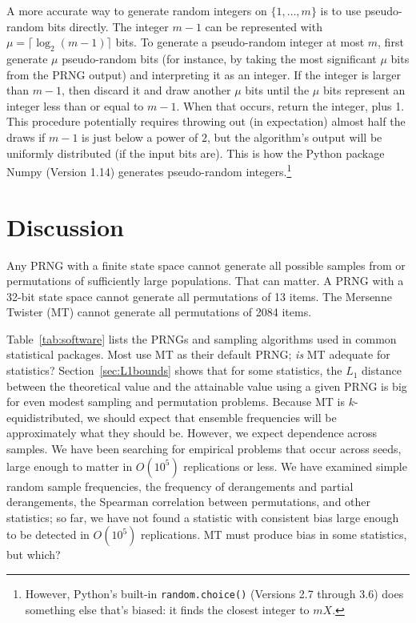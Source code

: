 \documentclass[graybox]{svmult}
\begin{document}
A more accurate way to generate random integers on $\{1, \dots, m\}$ is to use pseudo-random bits directly. 
The integer $m-1$ can be represented with $\mu = \lceil \log_2(m-1) \rceil$ bits. 
To generate a pseudo-random integer at most $m$, first generate $\mu$ pseudo-random bits (for instance, by taking the most significant $\mu$ bits from the PRNG output) and interpreting it as an integer.  
If the integer is larger than $m-1$, then discard it and draw another $\mu$ bits until the $\mu$ bits represent an integer less than or equal to $m-1$.
When that occurs, return the integer, plus 1.
This procedure potentially requires throwing out (in expectation) almost half the draws if $m-1$ is 
just below a power of $2$, but the algorithm's output will be uniformly distributed (if the input bits are).
This is how the Python package Numpy (Version 1.14) generates pseudo-random integers.\footnote{
However, Python's built-in \texttt{random.choice()} (Versions 2.7 through 3.6) does something else that's biased: it finds the closest integer to $mX$.
}


\section{Discussion}
\label{sec:discussion}

Any PRNG with a finite state space cannot generate all possible samples from or permutations of 
sufficiently large populations.
That can matter.
A PRNG with a 32-bit state space cannot generate all permutations of 13 items.
The Mersenne Twister (MT) cannot generate all permutations of 2084 items.

Table~\ref{tab:software} lists the PRNGs and sampling algorithms used in common statistical packages.
Most use MT as their default PRNG; \emph{is} MT adequate for statistics?
Section~\ref{sec:L1bounds} shows that for some statistics, the $L_1$ distance between the theoretical value and the attainable value using a given PRNG
 is big for even modest sampling and permutation problems.
Because MT is $k$-equidistributed, we should expect that ensemble frequencies will be approximately
what they should be.
However, we expect dependence across samples.
We have been searching for empirical problems that occur across seeds, large enough to matter in 
$O(10^5)$ replications or less.
We have examined simple random sample frequencies, the frequency of derangements and partial derangements, the Spearman correlation between permutations, 
and other statistics; so far, we have not found a statistic with consistent
bias large enough to be detected in $O(10^5)$ replications.
MT must produce bias in some statistics, but which?
\end{document}
